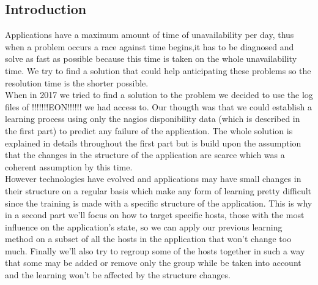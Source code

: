 \documentclass[10pt,a4paper,oneside]{article}
\begin{document}
\begin{multicols}{2}
\section{Introduction}
Applications have a maximum amount of time of unavailability per day, thus when a problem occurs a race against time begins,it has to be diagnosed and solve as fast as possible because this time is taken on the whole unavailability time. We try to find a solution that could help anticipating these problems so the resolution time is the shorter possible.
\\
When in 2017 we tried to find a solution to the problem we decided to use the log files of !!!!!!!EON!!!!!! we had access to. Our thougth was that we could establish a learning process using only the nagios disponibility data (which is described in the first part) to predict any failure of the application. The whole solution is explained in details throughout the first part but is build upon the assumption that the changes in the structure of the application are scarce which was a coherent assumption by this time.
\\ However technologies have evolved and applications may have small changes in their structure on a regular basis which make any form of learning pretty difficult since the training is made with a specific structure of the application. This is why in a second part we'll focus on how to target specific hosts, those with the most influence on the application's state, so we can apply our previous learning method on a subset of all the hosts in the application that won't change too much. Finally we'll also try to regroup some of the hosts together in such a way that some may be added or remove only the group while be taken into account and the learning won't be affected by the structure changes.
\end{multicols}

\end{document}
